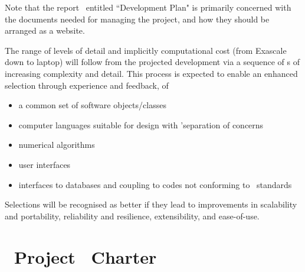 Note that the report~\cite{y2d34} entitled ``Development Plan" is primarily
concerned with the documents needed for managing the project, and how
they should be arranged as a website.

The range of levels of detail and implicitly computational cost (from Exascale 
down to laptop) will follow from the projected development via a sequence of 
\papp s of increasing complexity and detail. This process is expected to 
enable an enhanced selection through experience and feedback, of
\begin{itemize}
\item a common set of software objects/classes
\item computer languages suitable for design with 'separation of concerns
\item numerical algorithms
\item user interfaces
\item interfaces to databases and coupling to codes not conforming to \nep \ standards
\end{itemize}
Selections will be recognised as better if they lead to improvements in 
scalability and portability, reliability and resilience, extensibility, and 
ease-of-use. 



\clearpage

\clearpage
\section{\exc \ Project \nep \ Charter}\label{sec:charter}

